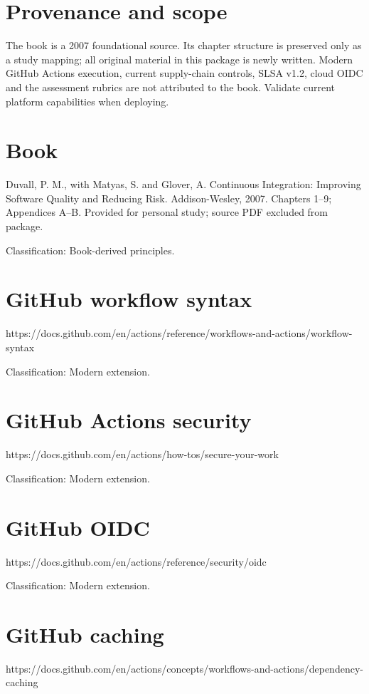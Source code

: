 \documentclass[11pt,letterpaper]{article}
\begin{document}
\makedoctitle
\makedocsummary
\tableofcontents
\clearpage
\section{Provenance and scope}
The book is a 2007 foundational source. Its chapter structure is preserved only as a study mapping; all original material in this package is newly written. Modern GitHub Actions execution, current supply-chain controls, SLSA v1.2, cloud OIDC and the assessment rubrics are not attributed to the book. Validate current platform capabilities when deploying.

\section{Book}
Duvall, P. M., with Matyas, S. and Glover, A. Continuous Integration: Improving Software Quality and Reducing Risk. Addison-Wesley, 2007. Chapters 1--9; Appendices A--B. Provided for personal study; source PDF excluded from package.

Classification: Book-derived principles.

\section{GitHub workflow syntax}
https://docs.github.com/en/actions/reference/workflows-and-actions/workflow-syntax

Classification: Modern extension.

\section{GitHub Actions security}
https://docs.github.com/en/actions/how-tos/secure-your-work

Classification: Modern extension.

\section{GitHub OIDC}
https://docs.github.com/en/actions/reference/security/oidc

Classification: Modern extension.

\section{GitHub caching}
https://docs.github.com/en/actions/concepts/workflows-and-actions/dependency-caching
\end{document}
